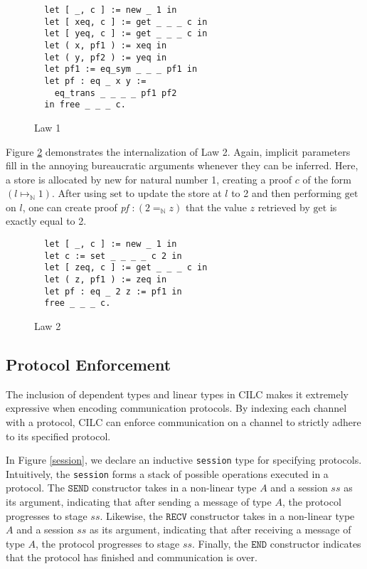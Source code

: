 \documentclass[sigplan,screen,review,authordraft]{acmart}
\newcommand{\new}{\text{new}}
\newcommand{\get}{\text{get}}
\newcommand{\set}{\text{set}}
\newcommand{\SEND}{\texttt{SEND}}
\newcommand{\RECV}{\texttt{RECV}}
\newcommand{\END}{\texttt{END}}
\begin{document}
\begin{figure}[h]
  \caption{Law 1}
  \begin{verbatim}
  let [ _, c ] := new _ 1 in
  let [ xeq, c ] := get _ _ _ c in
  let [ yeq, c ] := get _ _ _ c in
  let ( x, pf1 ) := xeq in
  let ( y, pf2 ) := yeq in
  let pf1 := eq_sym _ _ _ pf1 in
  let pf : eq _ x y := 
    eq_trans _ _ _ _ pf1 pf2 
  in free _ _ _ c.
  \end{verbatim}
  \label{law1}
  \Description{}
\end{figure}

Figure \ref{law2} demonstrates the internalization of Law 2. Again, implicit parameters fill in the annoying bureaucratic arguments whenever they can be inferred. Here, a store is allocated by $\new$ for natural number 1, creating a proof $c$ of the form $(l \mapsto_\mathbb{N} 1)$. After using $\set$ to update the store at $l$ to 2 and then performing $\get$ on $l$, one can create proof \textit{pf} $: (2 =_\mathbb{N} z)$ that the value $z$ retrieved by $\get$ is exactly equal to 2.

\begin{figure}[h]
  \caption{Law 2}
  \begin{verbatim}
  let [ _, c ] := new _ 1 in
  let c := set _ _ _ _ c 2 in
  let [ zeq, c ] := get _ _ _ c in
  let ( z, pf1 ) := zeq in
  let pf : eq _ 2 z := pf1 in
  free _ _ _ c.
  \end{verbatim}
  \label{law2}
  \Description{}
\end{figure}

\subsection{Protocol Enforcement}
The inclusion of dependent types and linear types in CILC makes it extremely expressive when encoding communication protocols. By indexing each channel with a protocol, CILC can enforce communication on a channel to strictly adhere to its specified protocol.

In Figure \ref{session}, we declare an inductive \texttt{session} type for specifying protocols. Intuitively, the \texttt{session}  forms a stack of possible operations executed in a protocol. The $\SEND$ constructor takes in a non-linear type $A$ and a session $ss$ as its argument, indicating that after sending a message of type $A$, the protocol progresses to stage $ss$. Likewise, the $\RECV$ constructor takes in a non-linear type $A$ and a session $ss$ as its argument, indicating that after receiving a message of type $A$, the protocol progresses to stage $ss$. Finally, the $\END$ constructor indicates that the protocol has finished and communication is over.
\end{document}
